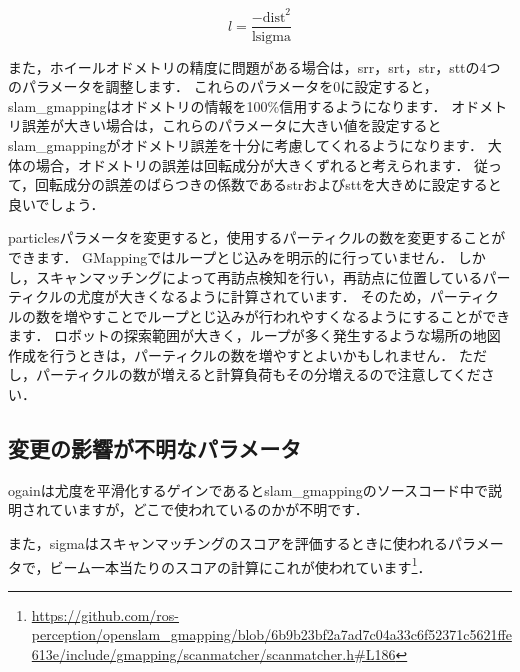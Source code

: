 \documentclass[{../../master}]{subfiles}
\begin{document}
\begin{equation}
  l = \frac{-\text{dist}^2}{\text{lsigma}}
  \label{eq:beam_likelihood_in_gmapping_program}
\end{equation}

また，ホイールオドメトリの精度に問題がある場合は，\textsf{srr}，\textsf{srt}，\textsf{str}，\textsf{stt}の4つのパラメータを調整します．
これらのパラメータを0に設定すると，\textsf{slam\_gmapping}はオドメトリの情報を100\%信用するようになります．
オドメトリ誤差が大きい場合は，これらのパラメータに大きい値を設定すると\textsf{slam\_gmapping}がオドメトリ誤差を十分に考慮してくれるようになります．
大体の場合，オドメトリの誤差は回転成分が大きくずれると考えられます．
従って，回転成分の誤差のばらつきの係数である\textsf{str}および\textsf{stt}を大きめに設定すると良いでしょう．

\textsf{particles}パラメータを変更すると，使用するパーティクルの数を変更することができます．
GMappingではループとじ込みを明示的に行っていません．
しかし，スキャンマッチングによって再訪点検知を行い，再訪点に位置しているパーティクルの尤度が大きくなるように計算されています．
そのため，パーティクルの数を増やすことでループとじ込みが行われやすくなるようにすることができます．
ロボットの探索範囲が大きく，ループが多く発生するような場所の地図作成を行うときは，パーティクルの数を増やすとよいかもしれません．
ただし，パーティクルの数が増えると計算負荷もその分増えるので注意してください．

\subsection{変更の影響が不明なパラメータ}

\textsf{ogain}は尤度を平滑化するゲインであると\textsf{slam\_gmapping}のソースコード中で説明されていますが，どこで使われているのかが不明です．

また，\textsf{sigma}はスキャンマッチングのスコアを評価するときに使われるパラメータで，ビーム一本当たりのスコアの計算にこれが使われています\footnote{\url{https://github.com/ros-perception/openslam_gmapping/blob/6b9b23bf2a7ad7c04a33c6f52371c5621ffe613e/include/gmapping/scanmatcher/scanmatcher.h\#L186}}．
\end{document}
